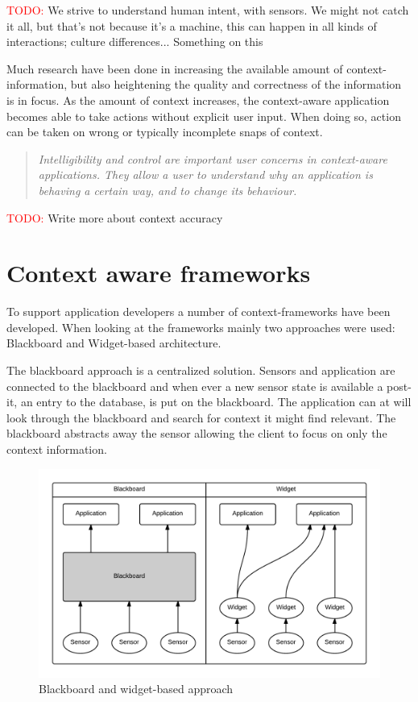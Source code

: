 \documentclass[]{report}
\newcommand\todo[1]{\textcolor{red}{TODO: }#1\PackageWarning{TODO:}{TODO tag!!}}
\begin{document}
\todo{We strive to understand human intent, with sensors. We might not catch it all, but that's not because it's a machine, this can happen in all kinds of interactions; culture differences... Something on this}


Much research have been done in increasing the available amount of context-information, but also heightening the quality and correctness of the information is in focus. As the amount of context increases, the context-aware application becomes able to take actions without explicit user input. When doing so, action can be taken on wrong or typically incomplete snaps of context. 


\blockquote{\textit{Intelligibility and control are important user concerns in context-aware applications. They allow a user to understand why an application is behaving a certain way, and to change its behaviour.}} \cite{Dey and Newberger (2009)}
\todo Write more about context accuracy


\section{Context aware frameworks}
To support application developers a number of context-frameworks have been developed. When looking at the frameworks mainly two approaches were used: Blackboard and Widget-based architecture.

The blackboard approach is a centralized solution. Sensors and application are connected to the blackboard and when ever a new sensor state is available a post-it, an entry to the database, is put on the blackboard. The application can at will look through the blackboard and search for context it might find relevant. The blackboard abstracts away the sensor allowing the client to focus on only the context information. 

\begin{figure}
\centering
\includegraphics[width=\linewidth]{blackboard-widget.png}
\caption{Blackboard and widget-based approach}
\label{fig:blackboard-widget}
\end{figure}
\end{document}
